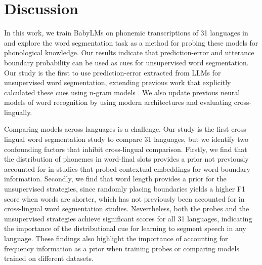 
\section{Discussion}

In this work, we train BabyLMs on phonemic transcriptions of 31 languages in \ipachildes and explore the word segmentation task as a method for probing these models for phonological knowledge. Our results indicate that prediction-error and utterance boundary probability can be used as cues for unsupervised word segmentation. Our study is the first to use prediction-error extracted from LLMs for unsupervised word segmentation, extending previous work that explicitly calculated these cues using n-gram models \citep{ccoltekin2014explicit, Coltekin2017, goriely2023word}. We also update previous neural models of word recognition \citep{elman-1990-finding, christiansen1998learning} by using modern architectures and evaluating cross-lingually.


Comparing models across languages is a challenge. Our study is the first cross-lingual word segmentation study to compare 31 languages, but we identify two confounding factors that inhibit cross-lingual comparison. Firstly, we find that the distribution of phonemes in word-final slots provides a prior not previously accounted for in studies that probed contextual embeddings for word boundary information. Secondly, we find that word length provides a prior for the unsupervised strategies, since randomly placing boundaries yields a higher F1 score when words are shorter, which has not previously been accounted for in cross-lingual word segmentation studies. Nevertheless, both the probes and the unsupervised strategies achieve significant scores for all 31 languages, indicating the importance of the distributional cue for learning to segment speech in any language. These findings also highlight the importance of accounting for frequency information as a prior when training probes or comparing models trained on different datasets.

